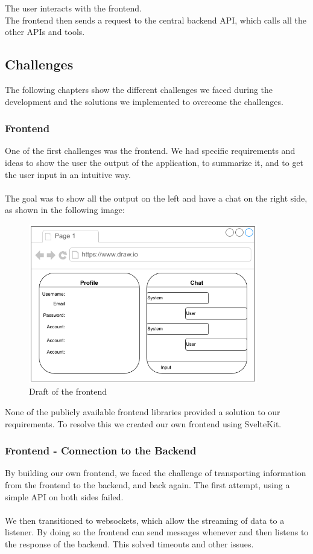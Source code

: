 \documentclass[
    a4paper,
    pagesize,
	pdftex,
    12pt,
]{scrartcl}
\begin{document}
The user interacts with the frontend. \\
The frontend then sends a request to the central backend API, which calls all the other APIs and tools.


\subsection{Challenges}
The following chapters show the different challenges we faced during the development and the solutions we implemented to overcome the challenges.

\subsubsection{Frontend}
One of the first challenges was the frontend. We had specific requirements and ideas to show the user the output of the application, to summarize it, and to get the user input in an intuitive way.
\\ \\
The goal was to show all the output on the left and have a chat on the right side, as shown in the following image:
\begin{figure}[H]
	\centering
	\includegraphics[width=10cm]{Frontend-draft.png}
	\caption{Draft of the frontend}
	\label{fig:draft-frontend}
\end{figure} 
None of the publicly available frontend libraries provided a solution to our requirements. To resolve this we created our own frontend using SvelteKit.

\subsubsection{Frontend - Connection to the Backend}
By building our own frontend, we faced the challenge of transporting information from the frontend to the backend, and back again. The first attempt, using a simple API on both sides failed.
\\ \\
We then transitioned to websockets, which allow the streaming of data to a listener. By doing so the frontend can send messages whenever and then listens to the response of the backend. This solved timeouts and other issues.
\end{document}

